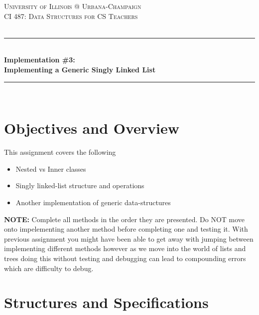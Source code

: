\documentclass[a4paper]{article}
\begin{document}
\begin{titlepage}

\newcommand{\HRule}{\rule{\linewidth}{0.5mm}} 							%
\center 
 
 
\textsc{\LARGE University of Illinois @ Urbana-Champaign}\\[1cm]

\textsc{\Large CI 487: Data Structures for CS Teachers}\\[0.2cm]
\textsc{\large }\\[1cm] 										%
\HRule \\[0.8cm]
{ \huge \bfseries Implementation \#3:\\\vspace{0.1cm}Implementing a Generic Singly Linked List}\\[0.7cm]								%
\HRule \\[0.8cm]
\vfill 
\end{titlepage}


\section{Objectives and Overview}

This assignment covers the following
\begin{itemize}
    \item Nested vs Inner classes
    \item Singly linked-list structure and operations
    \item Another implementation of generic data-structures
\end{itemize}

\textbf{NOTE:} Complete all methods in the order they are presented. Do NOT
move onto impelementing another method before completing one and testing it.
With previous assignment you might have been able to get away with jumping between
implementing different methods however as we move into the world of lists and trees
doing this without testing and debugging can lead to compounding errors which are 
difficulty to debug.

\section{Structures and Specifications}
\end{document}

